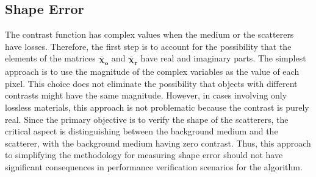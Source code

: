 \documentclass{IEEEtran}
\newcommand{\Xo}{\boldsymbol{\bar{\chi}_o}}
\newcommand{\Xr}{\boldsymbol{\bar{\chi}_r}}
\begin{document}
		\subsection{Shape Error}\label{sec:indicators:shapeerror}
		
			
			The contrast function has complex values when the medium or the scatterers have losses. Therefore, the first step is to account for the possibility that the elements of the matrices $\Xo$ and $\Xr$ have real and imaginary parts. The simplest approach is to use the magnitude of the complex variables as the value of each pixel. This choice does not eliminate the possibility that objects with different contrasts might have the same magnitude. However, in cases involving only lossless materials, this approach is not problematic because the contrast is purely real. Since the primary objective is to verify the shape of the scatterers, the critical aspect is distinguishing between the background medium and the scatterer, with the background medium having zero contrast. Thus, this approach to simplifying the methodology for measuring shape error should not have significant consequences in performance verification scenarios for the algorithm.
			
			
\end{document}
